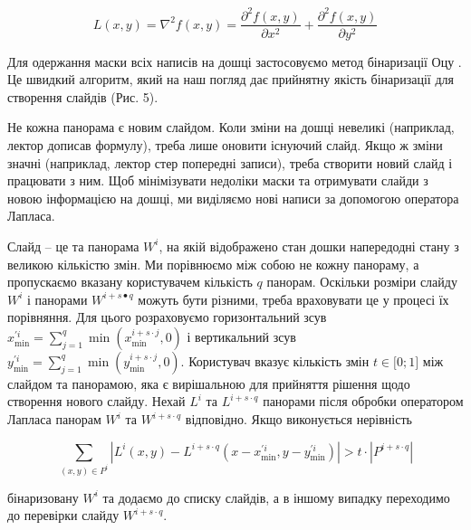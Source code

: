 \begin{equation}
L(x,y) = \nabla^{2}f(x,y) = \frac{\partial^{2}f(x,y)}{\partial x^{2}} + \frac{\partial^{2}f(x,y)}{\partial y^{2}}
\end{equation}

Для одержання маски всіх написів на дошці застосовуємо метод бінаризації
Оцу . Це швидкий алгоритм, який на наш погляд дає прийнятну
якість бінаризації для створення слайдів (Рис. 5).

Не кожна панорама є новим слайдом. Коли зміни на дошці невеликі
(наприклад, лектор дописав формулу), треба лише оновити існуючий слайд.
Якщо ж зміни значні (наприклад, лектор стер попередні записи), треба
створити новий слайд і працювати з ним. Щоб мінімізувати недоліки маски
та отримувати слайди з новою інформацією на дошці, ми виділяємо нові
написи за допомогою оператора Лапласа.

Слайд -- це та панорама \(W^{i}\), на якій відображено стан дошки
напередодні стану з великою кількістю змін. Ми порівнюємо між собою не
кожну панораму, а пропускаємо вказану користувачем кількість \(q\)
панорам. Оскільки розміри слайду \(W^{i}\) і панорами
\(W^{i + s \bullet q}\) можуть бути різними, треба враховувати це у
процесі їх порівняння. Для цього розраховуємо горизонтальний зсув
\(x_{\min}^{'i} = \sum_{j = 1}^{q}{\min\left( x_{\min}^{i + s \cdot j},0 \right)}\)
і вертикальний зсув
\(y_{\min}^{'i} = \sum_{j = 1}^{q}{\min\left( y_{\min}^{i + s \cdot j},0 \right)}\).
Користувач вказує кількість змін \(t \in \lbrack 0;1\rbrack\) між
слайдом та панорамою, яка є вирішальною для прийняття рішення щодо
створення нового слайду. Нехай \(L^{i}\) та \(L^{i + s \cdot q}\)
панорами після обробки оператором Лапласа панорам \(W^{i}\) та
\(W^{i + s \cdot q}\) відповідно. Якщо виконується нерівність

\begin{equation}
\sum_{(x,y) \in P^{i}}^{}| L^{i}(x,y) - L^{i + s \cdot q}( x - x_{\min}^{'i},y - y_{\min}^{'i} ) | > t \cdot | P^{i + s \cdot q} |
\end{equation}

бінаризовану \(W^{i}\) та додаємо до списку слайдів, а в іншому випадку переходимо до
перевірки слайду \(W^{i + s \cdot q}\).